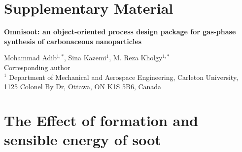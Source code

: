 \section*{Supplementary Material}

\begin{center}
	\vspace*{1cm} %
	\textbf{\LARGE 		Omnisoot: an object-oriented process design package for gas-phase synthesis of carbonaceous nanoparticles} 
\end{center}

\begin{center}
	Mohammad Adib$^{1,*}$, Sina Kazemi$^1$, M. Reza Kholgy$^{1,*}$ \\
	{\small *Corresponding author} \\
	$^1$ Department of Mechanical and Aerospace Engineering, Carleton University, 1125 Colonel By Dr, Ottawa, ON K1S 5B6, Canada
\end{center}

\beginsupplement


\section{The Effect of formation and sensible energy of soot}

